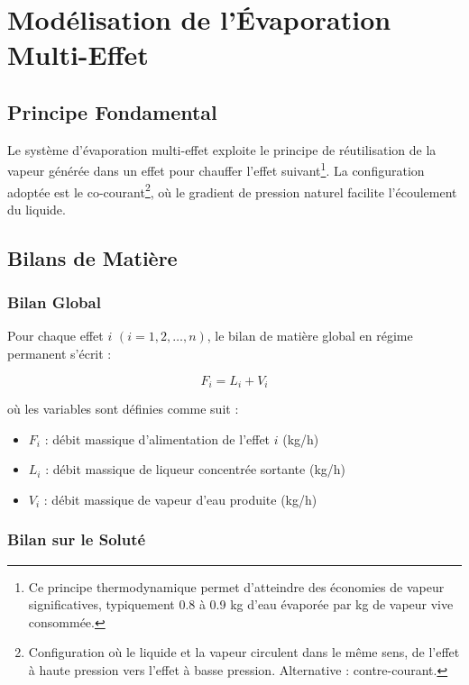 \documentclass[12pt,a4paper,twoside]{article}
\begin{document}
\section{Modélisation de l'Évaporation Multi-Effet}

\subsection{Principe Fondamental}

\lettrine[lines=2]{L}{}e système d'évaporation multi-effet exploite le principe de réutilisation de la vapeur générée dans un effet pour chauffer l'effet suivant\footnote{Ce principe thermodynamique permet d'atteindre des économies de vapeur significatives, typiquement 0.8 à 0.9 kg d'eau évaporée par kg de vapeur vive consommée.}. La configuration adoptée est le co-courant\footnote{Configuration où le liquide et la vapeur circulent dans le même sens, de l'effet à haute pression vers l'effet à basse pression. Alternative : contre-courant.}, où le gradient de pression naturel facilite l'écoulement du liquide.

\subsection{Bilans de Matière}

\subsubsection{Bilan Global}

Pour chaque effet $i$ $(i = 1, 2, \ldots, n)$, le bilan de matière global en régime permanent s'écrit :

\begin{equation}
\boxed{F_i = L_i + V_i}
\label{eq:mass_global}
\end{equation}

où les variables sont définies comme suit :
\begin{itemize}[noitemsep]
    \item $F_i$ : débit massique d'alimentation de l'effet $i$ (kg/h)
    \item $L_i$ : débit massique de liqueur concentrée sortante (kg/h)
    \item $V_i$ : débit massique de vapeur d'eau produite (kg/h)
\end{itemize}

\subsubsection{Bilan sur le Soluté}
\end{document}
